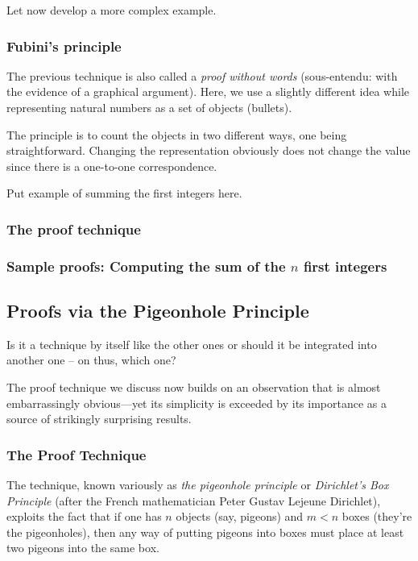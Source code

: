 Let now develop a more complex example.



\subsubsection{Fubini's principle}
\label{sec:Fubini}


The previous technique is also called a \textit{proof without words}
(sous-entendu: with the evidence of a graphical argument).
Here, we use a slightly different idea while representing natural numbers as a set of objects (bullets).

The principle is to count the objects in two different ways, one being straightforward.
Changing the representation obviously does not change the value
since there is a one-to-one correspondence.
\medskip

{\Denis Put example of summing the first integers here.}


\subsubsection{The proof technique}


\subsubsection{Sample proofs: Computing the sum of the $n$ first integers}



\subsection{Proofs via the Pigeonhole Principle}
\label{sec:pigeonhole}

{\Denis Is it a technique by itself like the other ones or should it be integrated into another one -- on thus, which one?}

The proof technique we discuss now builds on an observation that is
almost embarrassingly obvious---yet its simplicity is exceeded by its
importance as a source of strikingly surprising results.

\subsubsection{The Proof Technique}

The technique, known variously as {\it the pigeonhole principle}
or {\it Dirichlet's Box Principle}
(after the French mathematician Peter Gustav Lejeune Dirichlet),
exploits the fact that if one has $n$ objects (say, pigeons) and $m <
n$ boxes (they're the pigeonholes), then any way of putting pigeons
into boxes must place at least two pigeons into the same box.


